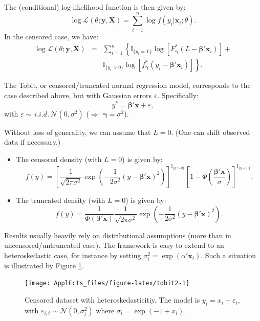 \documentclass[
  12pt,
]{book}
\theoremstyle{definition}
\theoremstyle{definition}
\theoremstyle{definition}
\theoremstyle{definition}
\theoremstyle{remark}
\begin{document}
The (conditional) log-likelihood function is then given by:
\[
\log \mathcal{L}(\theta;\mathbf{y},\mathbf{X}) = \sum_{i=1}^n \log f(y_i|\mathbf{x}_i;\theta).
\]
In the censored case, we have:
\begin{eqnarray*}
\log \mathcal{L}(\theta;\mathbf{y},\mathbf{X}) &=& \sum_{i=1}^n \left\{
\mathbb{I}_{\{y_i=L\}}\log\left[F_{\boldsymbol\gamma}^*(L-  \boldsymbol\beta'\mathbf{x}_i)\right] + \right.\\
&& \left. \mathbb{I}_{\{y_i>0\}} \log \left[f_{\boldsymbol\gamma}^*(y_i -  \boldsymbol\beta'\mathbf{x}_i)\right]\right\}.
\end{eqnarray*}

The Tobit, or censored/truncated normal regression model, corresponds to the case described above, but with Gaussian errors \(\varepsilon\). Specifically:
\[
y^* = \boldsymbol\beta'\mathbf{x} + \varepsilon,
\]
with \(\varepsilon \sim \,i.i.d.\,\mathcal{N}(0,\sigma^2)\) (\(\Rightarrow\) \(\boldsymbol\gamma = \sigma^2\)).

Without loss of generality, we can assume that \(L=0\). (One can shift observed data if necessary.)

\begin{itemize}
\item
  The censored density (with \(L=0\)) is given by:
  \[
  f(y) = \left[
  \frac{1}{\sqrt{2 \pi \sigma^2}}\exp\left(-\frac{1}{2 \sigma^2}(y - \boldsymbol\beta'\mathbf{x})^2\right)
  \right]^{\mathbb{I}_{\{y>0\}}}
  \left[
  1 - \Phi\left(\frac{\boldsymbol\beta'\mathbf{x}}{\sigma}\right)
  \right]^{\mathbb{I}_{\{y=0\}}}.
  \]
\item
  The truncated density (with \(L=0\)) is given by:
  \[
  f(y) = \frac{1}{\Phi(\boldsymbol\beta'\mathbf{x})}
  \frac{1}{\sqrt{2 \pi \sigma^2}}\exp\left(-\frac{1}{2 \sigma^2}(y - \boldsymbol\beta'\mathbf{x})^2\right).
  \]
\end{itemize}

Results usually heavily rely on distributional assumptions (more than in uncensored/untruncated case). The framework is easy to extend to an heteroskedastic case, for instance by setting \(\sigma_i^2=\exp(\alpha'\mathbf{x}_i)\). Such a situation is illustrated by Figure \ref{fig:tobit2}.

\begin{figure}
\texttt{[image: ApplEcts\_files/figure-latex/tobit2-1]} \caption{Censored dataset with heteroskedasticitiy. The model is $y_i = x_i + \varepsilon_i$, with $\varepsilon_{i,t} \sim \mathcal{N}(0,\sigma_i^2)$ where $\sigma_i = \exp(-1 + x_i)$.}\label{fig:tobit2}
\end{figure}
\end{document}
